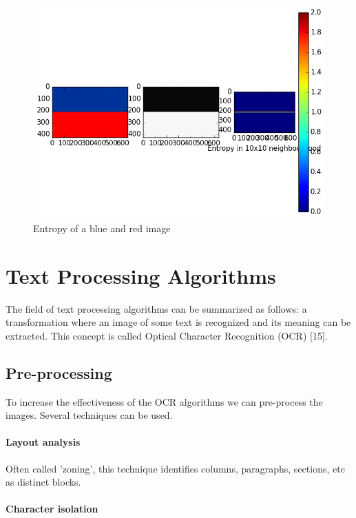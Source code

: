 \documentclass[12pt]{article}
\begin{document}
\begin{figure}[H]
\centering
\includegraphics[scale = 0.54]{img/entropy_blue_red}
\caption{Entropy of a blue and red image}
\label{entropy_blue_red}
\end{figure} 
\newpage

\section{Text Processing Algorithms}

The field of text processing algorithms can be summarized as follows: a transformation where an image of some text is recognized and its meaning can be extracted. This concept is called Optical Character Recognition (OCR) [15].

\subsection{Pre-processing}

To increase the effectiveness of the OCR algorithms we can pre-process the images.
Several techniques can be used.

\paragraph{Layout analysis}

Often called 'zoning', this technique identifies columns, paragraphs, sections, etc as distinct blocks.

\paragraph{Character isolation}
\end{document}
